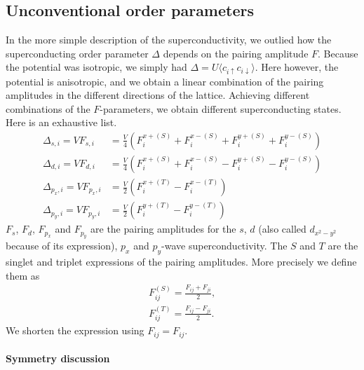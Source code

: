 \documentclass[../main.tex]{subfile}
\begin{document}
\subsection{Unconventional order parameters}\label{sec:Unconventional_order_parameters}
In the more simple description of the superconductivity, we outlied how the superconducting order parameter $\Delta$ depends on the pairing amplitude $F$.
Because the potential was isotropic, we simply had $\Delta = U \langle c_{i\uparrow}c_{i\downarrow}\rangle$. Here however, the potential is anisotropic, 
and we obtain a linear combination of the pairing amplitudes in the different directions of the lattice. Achieving different combinations of the $F$-parameters, 
we obtain different superconducting states. Here is an exhaustive list.
\begin{align*}
    \Delta_{s,i} = V F_{s,i} &= \frac{V}{4} \left(F_{i}^{x+(S)} + F_{i}^{x-(S)} + F_{i}^{y+(S)} + F_{i}^{y-(S)}\right)\\
    \Delta_{d,i} = V F_{d,i} &= \frac{V}{4} \left(F_{i}^{x+(S)} + F_{i}^{x-(S)} - F_{i}^{y+(S)} - F_{i}^{y-(S)}\right)\\
    \Delta_{p_x,i} = V F_{p_x,i} &= \frac{V}{2} \left(F_{i}^{x+(T)} - F_{i}^{x-(T)}\right) \\
    \Delta_{p_y,i} = V F_{p_y,i} &= \frac{V}{2} \left(F_{i}^{y+(T)} - F_{i}^{y-(T)}\right)
\end{align*}
$F_s$, $F_d$, $F_{p_x}$ and $F_{p_y}$ are the pairing amplitudes for the $s$, $d$ (also called $d_{x^2-y^2}$ because of its expression), $p_x$ and $p_y$-wave superconductivity.
The $S$ and $T$ are the singlet and triplet expressions of the pairing amplitudes. More precisely we define them as
\begin{align}
    F_{ij}^{(S)} = \frac{F_{ij} + F_{ji}}{2}, \\
    F_{ij}^{(T)} = \frac{F_{ij} - F_{ji}}{2}.
\end{align}
We shorten the expression using $F_{ij} = F_{ij}$.
\paragraph{Symmetry discussion} $~$\\
\end{document}
